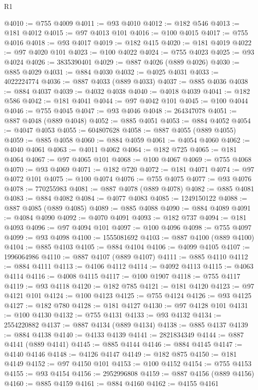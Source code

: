 \begin{lexlean}{R1}
\begin{coremodule}
@4010 := @755 @4009
@4011 := @93 @4010
@4012 := @182 @546
@4013 := @181 @4012
@4015 := @97 @4013 @101
@4016 := @100 @4015
@4017 := @755 @4016
@4018 := @93 @4017
@4019 := @182 @415
@4020 := @181 @4019
@4022 := @97 @4020 @101
@4023 := @100 @4022
@4024 := @755 @4023
@4025 := @93 @4024
@4026 := 3835390401
@4029 := @887 @4026 (@889 @4026)
@4030 := @885 @4029
@4031 := @884 @4030
@4032 := @4025 @4031
@4033 := 4022224774
@4036 := @887 @4033 (@889 @4033)
@4037 := @885 @4036
@4038 := @884 @4037
@4039 := @4032 @4038
@4040 := @4018 @4039
@4041 := @182 @586
@4042 := @181 @4041
@4044 := @97 @4042 @101
@4045 := @100 @4044
@4046 := @755 @4045
@4047 := @93 @4046
@4048 := 264347078
@4051 := @887 @4048 (@889 @4048)
@4052 := @885 @4051
@4053 := @884 @4052
@4054 := @4047 @4053
@4055 := 604807628
@4058 := @887 @4055 (@889 @4055)
@4059 := @885 @4058
@4060 := @884 @4059
@4061 := @4054 @4060
@4062 := @4040 @4061
@4063 := @4011 @4062
@4064 := @182 @725
@4065 := @181 @4064
@4067 := @97 @4065 @101
@4068 := @100 @4067
@4069 := @755 @4068
@4070 := @93 @4069
@4071 := @182 @720
@4072 := @181 @4071
@4074 := @97 @4072 @101
@4075 := @100 @4074
@4076 := @755 @4075
@4077 := @93 @4076
@4078 := 770255983
@4081 := @887 @4078 (@889 @4078)
@4082 := @885 @4081
@4083 := @884 @4082
@4084 := @4077 @4083
@4085 := 1249150122
@4088 := @887 @4085 (@889 @4085)
@4089 := @885 @4088
@4090 := @884 @4089
@4091 := @4084 @4090
@4092 := @4070 @4091
@4093 := @182 @737
@4094 := @181 @4093
@4096 := @97 @4094 @101
@4097 := @100 @4096
@4098 := @755 @4097
@4099 := @93 @4098
@4100 := 1555081692
@4103 := @887 @4100 (@889 @4100)
@4104 := @885 @4103
@4105 := @884 @4104
@4106 := @4099 @4105
@4107 := 1996064986
@4110 := @887 @4107 (@889 @4107)
@4111 := @885 @4110
@4112 := @884 @4111
@4113 := @4106 @4112
@4114 := @4092 @4113
@4115 := @4063 @4114
@4116 := @4008 @4115
@4117 := @100 @1907
@4118 := @755 @4117
@4119 := @93 @4118
@4120 := @182 @785
@4121 := @181 @4120
@4123 := @97 @4121 @101
@4124 := @100 @4123
@4125 := @755 @4124
@4126 := @93 @4125
@4127 := @182 @780
@4128 := @181 @4127
@4130 := @97 @4128 @101
@4131 := @100 @4130
@4132 := @755 @4131
@4133 := @93 @4132
@4134 := 2554220882
@4137 := @887 @4134 (@889 @4134)
@4138 := @885 @4137
@4139 := @884 @4138
@4140 := @4133 @4139
@4141 := 2821834349
@4144 := @887 @4141 (@889 @4141)
@4145 := @885 @4144
@4146 := @884 @4145
@4147 := @4140 @4146
@4148 := @4126 @4147
@4149 := @182 @875
@4150 := @181 @4149
@4152 := @97 @4150 @101
@4153 := @100 @4152
@4154 := @755 @4153
@4155 := @93 @4154
@4156 := 2952996808
@4159 := @887 @4156 (@889 @4156)
@4160 := @885 @4159
@4161 := @884 @4160
@4162 := @4155 @4161

\end{coremodule}
\end{lexlean}
